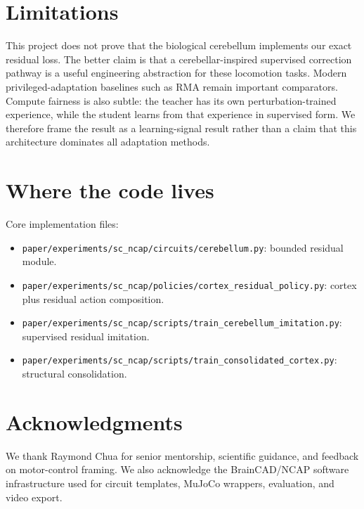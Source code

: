 \documentclass[11pt]{article}
\begin{document}
\section{Limitations}
This project does not prove that the biological cerebellum implements our exact residual loss.  The better claim is that a cerebellar-inspired supervised correction pathway is a useful engineering abstraction for these locomotion tasks.  Modern privileged-adaptation baselines such as RMA remain important comparators.  Compute fairness is also subtle: the teacher has its own perturbation-trained experience, while the student learns from that experience in supervised form.  We therefore frame the result as a learning-signal result rather than a claim that this architecture dominates all adaptation methods.

\section{Where the code lives}
Core implementation files:
\begin{itemize}
\item \texttt{paper/experiments/sc\_ncap/circuits/cerebellum.py}: bounded residual module.
\item \texttt{paper/experiments/sc\_ncap/policies/cortex\_residual\_policy.py}: cortex plus residual action composition.
\item \texttt{paper/experiments/sc\_ncap/scripts/train\_cerebellum\_imitation.py}: supervised residual imitation.
\item \texttt{paper/experiments/sc\_ncap/scripts/train\_consolidated\_cortex.py}: structural consolidation.
\end{itemize}

\section*{Acknowledgments}
We thank Raymond Chua for senior mentorship, scientific guidance, and feedback on motor-control framing.  We also acknowledge the BrainCAD/NCAP software infrastructure used for circuit templates, MuJoCo wrappers, evaluation, and video export.



\end{document}

